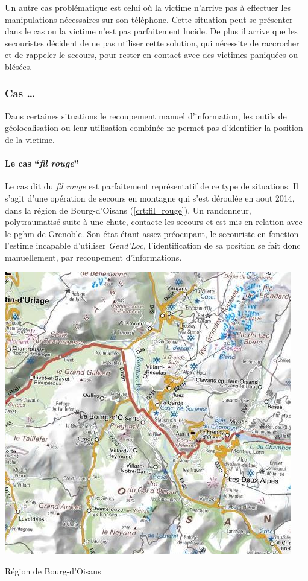 Un autre cas problématique est celui où la victime n'arrive pas à
effectuer les manipulations nécessaires sur son téléphone. Cette
situation peut se présenter dans le cas ou la victime n'est pas
parfaitement lucide. De plus il arrive que les secouristes décident de
ne pas utiliser cette solution, qui nécessite de raccrocher et de
rappeler le secours, pour rester en contact avec des victimes
paniquées ou blésées.

\subsubsection{Cas …}
\label{subsec:1-1-2-3}

Dans certaines situations le recoupement manuel d'information, les
outils de géolocalisation ou leur utilisation combinée ne permet pas
d'identifier la position de la victime. 

\paragraph{Le cas \enquote{\emph{fil rouge}}}

Le cas dit du \emph{fil rouge} est parfaitement représentatif de ce
type de situations. Il s'agit d'une opération de secours en montagne
qui s'est déroulée en aout 2014, dans la région de Bourg-d'Oisans
(\autoref{crt:fil_rouge}). Un randonneur, polytraumatisé suite à une
chute, contacte les secours et est mis en relation avec le \ac{pghm}
de Grenoble. Son état étant assez préocupant, le secouriste en
fonction l'estime incapable d'utiliser \emph{Gend'Loc,}
l'identification de sa position se fait donc manuellement, par
recoupement d'informations.

\begin{carte}
  \centering
  \includegraphics{../figures/bourdOisans.jpg}
  \caption{Région de Bourg-d'Oisans}
  \label{crt:fil_rouge}
\end{carte}

